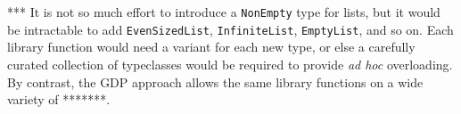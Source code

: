 \documentclass[format=sigplan, review=false, screen=true]{acmart}
\begin{document}
*** It is not so much effort to introduce a \texttt{NonEmpty} type for lists, but it
would be intractable to add \texttt{EvenSizedList}, \texttt{InfiniteList},
\texttt{EmptyList}, and so on. Each library function would need a variant
for each new type, or else a carefully curated collection of typeclasses would
be required to provide \emph{ad hoc} overloading. By contrast, the GDP approach
allows the same library functions on a wide variety of *******.





   
\end{document}
